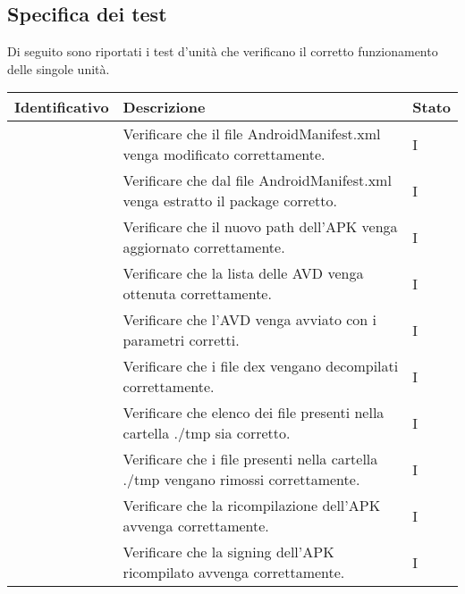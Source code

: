 \subsection{Specifica dei test}\label{subsec:specifica-dei-test-unitari}
Di seguito sono riportati i test d'unità che verificano il corretto funzionamento delle singole unità.
\begin{center}
    \begin{longtable}{ |C{3cm} | C{8.5cm}| C{1.5cm} |}\hline
        \textbf{Identificativo} & \textbf{Descrizione} & \textbf{Stato} \\\hline
                     & Verificare che il file AndroidManifest.xml venga modificato correttamente.                              & I              \\\hline
                     & Verificare che dal file AndroidManifest.xml venga estratto il package corretto.                         & I              \\\hline
                     & Verificare che il nuovo path dell'APK venga aggiornato correttamente.                                   & I              \\\hline
                     & Verificare che la lista delle AVD venga ottenuta correttamente.                                         & I              \\\hline
                     & Verificare che l'AVD venga avviato con i parametri corretti.                                            & I              \\\hline
                     & Verificare che i file dex vengano decompilati correttamente.                                            & I              \\\hline
                     & Verificare che elenco dei file presenti nella cartella ./tmp sia corretto.                              & I              \\\hline
                     & Verificare che i file presenti nella cartella ./tmp vengano rimossi correttamente.                      & I              \\\hline
                     & Verificare che la ricompilazione dell'APK avvenga correttamente.                                        & I              \\\hline
                     & Verificare che la signing dell'APK ricompilato avvenga correttamente.                                   & I              \\\hline

\end{longtable}
\end{center}
